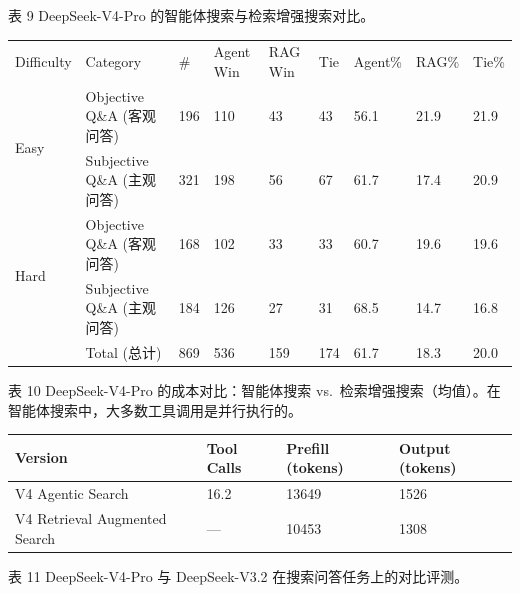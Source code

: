表 9 \textbar{} DeepSeek-V4-Pro 的智能体搜索与检索增强搜索对比。

{\def\LTcaptype{none} %
\begin{longtable}[]{@{}lllllllll@{}}
\toprule\noalign{}
\endhead
\bottomrule\noalign{}
\endlastfoot
Difficulty & Category & \# & Agent Win & RAG Win & Tie & Agent\% & RAG\%
& Tie\% \\
\multirow{2}{*}{Easy} & Objective Q\&A (客观问答) & 196 & 110 & 43 & 43
& 56.1 & 21.9 & 21.9 \\
& Subjective Q\&A (主观问答) & 321 & 198 & 56 & 67 & 61.7 & 17.4 &
20.9 \\
\multirow{2}{*}{Hard} & Objective Q\&A (客观问答) & 168 & 102 & 33 & 33
& 60.7 & 19.6 & 19.6 \\
& Subjective Q\&A (主观问答) & 184 & 126 & 27 & 31 & 68.5 & 14.7 &
16.8 \\
& Total (总计) & 869 & 536 & 159 & 174 & 61.7 & 18.3 & 20.0 \\
\end{longtable}
}

表 10 \textbar{} DeepSeek-V4-Pro 的成本对比：智能体搜索 vs.~检索增强搜索（均值）。在智能体搜索中，大多数工具调用是并行执行的。

{\def\LTcaptype{none} %
\begin{longtable}[]{@{}|l|l|l|l|@{}}
\toprule\noalign{}
\endhead
\bottomrule\noalign{}
\endlastfoot
\hline
Version & Tool Calls & Prefill (tokens) & Output (tokens) \\
\hline
V4 Agentic Search & 16.2 & 13649 & 1526 \\
\hline
V4 Retrieval Augmented Search & --- & 10453 & 1308 \\
\hline
\end{longtable}
}

表 11 \textbar{} DeepSeek-V4-Pro 与 DeepSeek-V3.2 在搜索问答任务上的对比评测。


